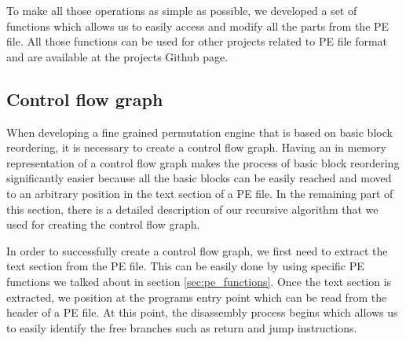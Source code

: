 \documentclass[11pt,final,conference,a4paper]{IEEEtran}
\begin{document}
To make all those operations as simple as possible, we developed a set of functions which allows us to easily access and modify all the parts from the PE file. All those functions can be used for other projects related to PE file format and are available at the projects Github page.

\subsection{Control flow graph}
\label{sec:cfg}
When developing a fine grained permutation engine that is based on basic block reordering, it is necessary to create a control flow graph. Having an in memory representation of a control flow graph makes the process of basic block reordering significantly easier because all the basic blocks can be easily reached and moved to an arbitrary position in the text section of a PE file. In the remaining part of this section, there is a detailed description of our recursive algorithm that we used for creating the control flow graph.

In order to successfully create a control flow graph, we first need to extract the text section from the PE file. This can be easily done by using specific PE functions we talked about in section \ref{sec:pe_functions}. Once the text section is extracted, we position at the programs entry point which can be read from the header of a PE file. At this point, the disassembly process begins which allows us to easily identify the free branches such as return and jump instructions. 
\end{document}
